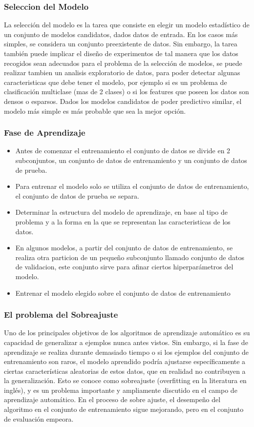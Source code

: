 \documentclass[a4paper,11pt,spanish]{book}
\begin{document}
	\subsubsection {Seleccion del Modelo}
	  La selección del modelo es la tarea que consiste en elegir un modelo estadístico de un conjunto de modelos candidatos, dados datos de entrada. 
	  En los casos más simples, se considera un conjunto preexistente de datos. 
	  Sin embargo, la tarea también puede implicar el diseño de experimentos de tal manera que los datos recogidos sean adecuados para el problema de la selección de modelos,
	  se puede realizar tambien un analisis exploratorio de datos, para poder detectar algunas caracteristicas que debe tener el modelo, por ejemplo si es un problema de clasificación
	  multiclase (mas de 2 clases) o si los features que poseen los datos son densos o esparsos.
	  Dados los modelos candidatos de poder predictivo similar, el modelo más simple es más probable que sea la mejor opción.

	\subsubsection {Fase de Aprendizaje}
	  \begin{itemize}
	    \item Antes de comenzar el entrenamiento el conjunto de datos se divide en 2 subconjuntos, un conjunto de datos de entrenamiento y un conjunto de datos de prueba. 
	    \item Para entrenar el modelo solo se utiliza el conjunto de datos de entrenamiento, el conjunto de datos de prueba se separa.
	    \item Determinar la estructura del modelo de aprendizaje, en base al tipo de problema y a la forma en la que se representan las caracteristicas de los datos.
	    \item En algunos modelos, a partir del conjunto de datos de entrenamiento, se realiza otra particion de un pequeño subconjunto llamado conjunto de datos de validacion, este conjunto sirve 
	    para afinar ciertos hiperparámetros del modelo.
	    \item Entrenar el modelo elegido sobre el conjunto de datos de entrenamiento
	  \end{itemize}
	
	\subsubsection {El problema del Sobreajuste}
	  Uno de los principales objetivos de los algoritmos de aprendizaje automático es su capacidad de generalizar a ejemplos nunca antes vistos. Sin embargo, si la fase 
	  de aprendizaje se realiza durante demasiado tiempo o si los ejemplos del conjunto de entrenamiento son raros, el modelo aprendido podría ajustarse específicamente 
	  a ciertas características aleatorias de estos datos, que en realidad no contribuyen a la generalización. Esto se conoce como sobreajuste (overfitting en la literatura en inglés), 
	  y es un problema importante y ampliamente discutido en el campo de aprendizaje automático. En el proceso de sobre ajuste, el desempeño del algoritmo en el
	  conjunto de entrenamiento sigue mejorando, pero en el conjunto de evaluación empeora.
	  
\end{document}
